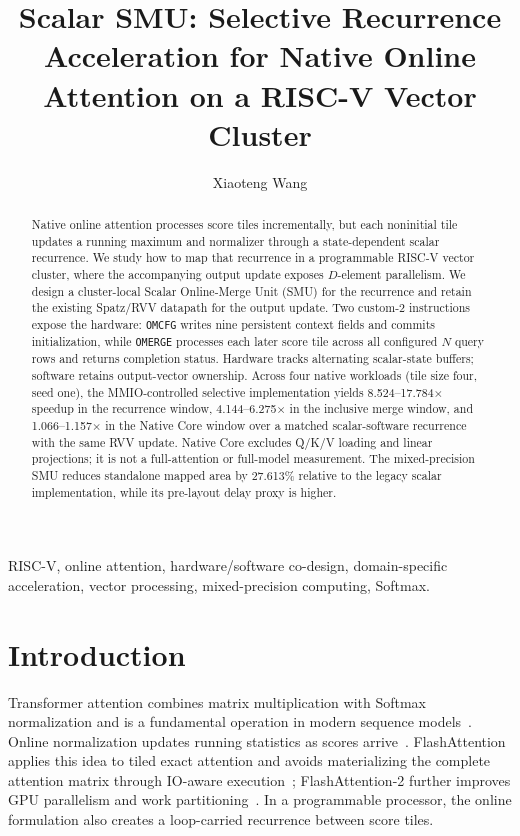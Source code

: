 \documentclass[journal]{IEEEtran}
\title{Scalar SMU: Selective Recurrence Acceleration for Native Online Attention on a RISC-V Vector Cluster}
\author{Xiaoteng Wang}
\begin{document}
\maketitle

\begin{abstract}
Native online attention processes score tiles incrementally, but each
noninitial tile updates a running maximum and normalizer through a
state-dependent scalar recurrence. We study how to map that recurrence in a
programmable RISC-V vector cluster, where the accompanying output update
exposes $D$-element parallelism. We design a cluster-local Scalar
Online-Merge Unit (SMU) for the recurrence and retain the existing Spatz/RVV
datapath for the output update. Two custom-2 instructions expose the hardware:
\texttt{OMCFG} writes nine persistent context fields and commits
initialization, while \texttt{OMERGE} processes each later score tile across
all configured $N$ query rows and returns completion status. Hardware tracks
alternating scalar-state buffers; software
retains output-vector ownership. Across four native workloads (tile size four,
seed one), the MMIO-controlled selective implementation yields
8.524--17.784$\times$ speedup in the recurrence window, 4.144--6.275$\times$
in the inclusive merge window, and
1.066--1.157$\times$ in the Native Core window over a matched scalar-software
recurrence with the same RVV update. Native Core excludes Q/K/V loading and
linear projections; it is not a full-attention or full-model measurement. The
mixed-precision SMU reduces standalone mapped area by 27.613\% relative to the
legacy scalar implementation, while its pre-layout delay proxy is higher.
\end{abstract}

\begin{IEEEkeywords}
RISC-V, online attention, hardware/software co-design, domain-specific
acceleration, vector processing, mixed-precision computing, Softmax.
\end{IEEEkeywords}

\section{Introduction}

Transformer attention combines matrix multiplication with Softmax
normalization and is a fundamental operation in modern sequence
models~\cite{vaswani2017attention}. Online normalization updates running
statistics as scores arrive~\cite{milakov2018online}. FlashAttention applies
this idea to tiled exact attention and avoids materializing the complete
attention matrix through IO-aware execution~\cite{dao2022flashattention};
FlashAttention-2 further improves GPU parallelism and work
partitioning~\cite{dao2024flashattention}. In a programmable processor, the
online formulation also creates a loop-carried recurrence between score tiles.
\end{document}
